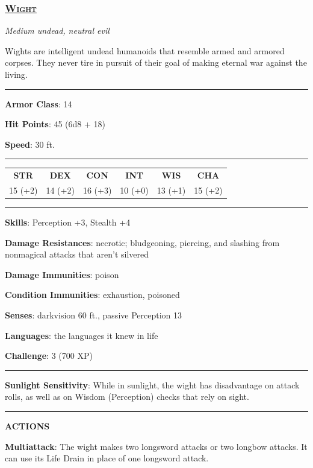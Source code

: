 \subsubsection*{\underline{\textsc{\Large Wight}}}
\noindent\emph{Medium undead, neutral evil}

Wights are intelligent undead humanoids that resemble armed and armored corpses. They never tire in pursuit of their goal of making eternal war against the living.

\noindent\rule{0.5\textwidth}{0.5pt}

\noindent\textbf{Armor Class}: 14

\noindent\textbf{Hit Points}: 45 (6d8 + 18)

\noindent\textbf{Speed}: 30 ft.

\noindent\rule{0.5\textwidth}{0.5pt}
\begin{table}[H]
	\begin{tabular}{cccccc}
		\textbf{STR} & \textbf{DEX} & \textbf{CON} & \textbf{INT} & \textbf{WIS} & \textbf{CHA} \\
		15 (+2) & 14 (+2) & 16 (+3) & 10 (+0) & 13 (+1) & 15 (+2) \\
	\end{tabular}
\end{table}
\noindent\rule{0.5\textwidth}{0.5pt}

\noindent\textbf{Skills}: Perception +3, Stealth +4

\noindent\textbf{Damage Resistances}:  necrotic; bludgeoning, piercing, and slashing from nonmagical attacks that aren't silvered

\noindent\textbf{Damage Immunities}: poison

\noindent\textbf{Condition Immunities}: exhaustion, poisoned

\noindent\textbf{Senses}: darkvision 60 ft., passive Perception 13

\noindent\textbf{Languages}: the languages it knew in life

\noindent\textbf{Challenge}: 3 (700 XP)

\noindent\rule{0.5\textwidth}{0.5pt}

\noindent\textbf{Sunlight Sensitivity}: While in sunlight, the wight has disadvantage on attack rolls, as well as on Wisdom (Perception) checks that rely on sight.

\noindent\rule{0.5\textwidth}{0.5pt}

\noindent\textbf{ACTIONS}

\noindent\textbf{Multiattack}: The wight makes two longsword attacks or two longbow attacks. It can use its Life Drain in place of one longsword attack.

